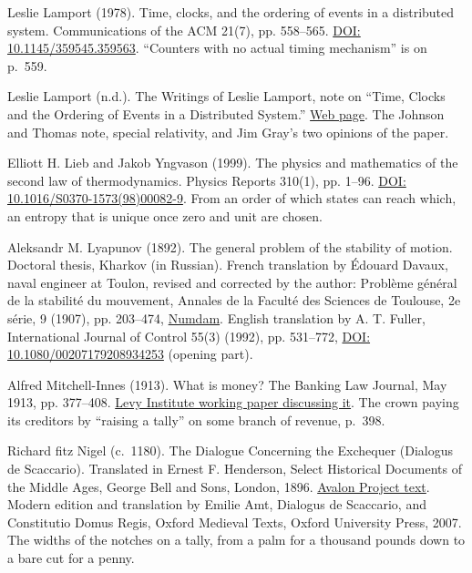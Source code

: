 \documentclass[11pt,twoside]{article}
\theoremstyle{thielethm}
\theoremstyle{thieledef}
\theoremstyle{thieledef}
\theoremstyle{thieledef}
\theoremstyle{thielethm}
\theoremstyle{thieleobs}
\theoremstyle{thielethm}
\begin{document}
\noindent Leslie Lamport (1978). Time, clocks, and the ordering of events in a distributed system. Communications of the ACM 21(7), pp. 558--565. \href{https://doi.org/10.1145/359545.359563}{DOI: 10.1145/359545.359563}. ``Counters with no actual timing mechanism'' is on p.~559.
\par\medskip

\noindent Leslie Lamport (n.d.). The Writings of Leslie Lamport, note on ``Time, Clocks and the Ordering of Events in a Distributed System.'' \href{https://lamport.azurewebsites.net/pubs/pubs.html}{Web page}. The Johnson and Thomas note, special relativity, and Jim Gray's two opinions of the paper.
\par\medskip

\noindent Elliott H. Lieb and Jakob Yngvason (1999). The physics and mathematics of the second law of thermodynamics. Physics Reports 310(1), pp. 1--96. \href{https://doi.org/10.1016/S0370-1573(98)00082-9}{DOI: 10.1016/S0370-1573(98)00082-9}. From an order of which states can reach which, an entropy that is unique once zero and unit are chosen.
\par\medskip

\noindent Aleksandr M. Lyapunov (1892). The general problem of the stability of motion. Doctoral thesis, Kharkov (in Russian). French translation by \'Edouard Davaux, naval engineer at Toulon, revised and corrected by the author: Probl\`eme g\'en\'eral de la stabilit\'e du mouvement, Annales de la Facult\'e des Sciences de Toulouse, 2e s\'erie, 9 (1907), pp. 203--474, \href{http://www.numdam.org/item/AFST_1907_2_9__203_0/}{Numdam}. English translation by A. T. Fuller, International Journal of Control 55(3) (1992), pp. 531--772, \href{https://doi.org/10.1080/00207179208934253}{DOI: 10.1080/00207179208934253} (opening part).
\par\medskip

\noindent Alfred Mitchell-Innes (1913). What is money? The Banking Law Journal, May 1913, pp. 377--408. \href{https://www.levyinstitute.org/pubs/wp_717.pdf}{Levy Institute working paper discussing it}. The crown paying its creditors by ``raising a tally'' on some branch of revenue, p.~398.
\par\medskip

\noindent Richard fitz Nigel (c.\ 1180). The Dialogue Concerning the Exchequer (Dialogus de Scaccario). Translated in Ernest F. Henderson, Select Historical Documents of the Middle Ages, George Bell and Sons, London, 1896. \href{https://avalon.law.yale.edu/medieval/excheq.asp}{Avalon Project text}. Modern edition and translation by Emilie Amt, Dialogus de Scaccario, and Constitutio Domus Regis, Oxford Medieval Texts, Oxford University Press, 2007. The widths of the notches on a tally, from a palm for a thousand pounds down to a bare cut for a penny.
\par\medskip
\end{document}
